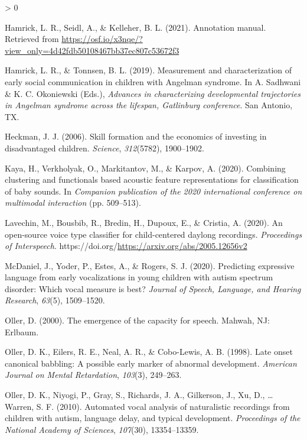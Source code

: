 \documentclass[
  english,
  ,man]{apa6}
\newlength{\cslhangindent}
\newenvironment{CSLReferences}[2] %
 {%
  \setlength{\parindent}{0pt}
  \ifodd #1 \everypar{\setlength{\hangindent}{\cslhangindent}}\ignorespaces\fi
  \ifnum #2 > 0
  \setlength{\parskip}{#2\baselineskip}
  \fi
 }%
 {}
\begin{document}
\begin{CSLReferences}{1}{0}
\leavevmode\hypertarget{ref-hamrick2021si}{}%
Hamrick, L. R., Seidl, A., \& Kelleher, B. L. (2021). Annotation manual. Retrieved from \url{https://osf.io/x3nqe/?view_only=4d42fdb50108467bb37ec807c53672f3}

\leavevmode\hypertarget{ref-hamrick2019measurement}{}%
Hamrick, L. R., \& Tonnsen, B. L. (2019). {Measurement and characterization of early social communication in children with Angelman syndrome}. In A. Sadhwani \& K. C. Okoniewski (Eds.), \emph{Advances in characterizing developmental trajectories in {A}ngelman syndrome across the lifespan, {G}atlinburg conference}. San Antonio, TX.

\leavevmode\hypertarget{ref-heckman2006skill}{}%
Heckman, J. J. (2006). Skill formation and the economics of investing in disadvantaged children. \emph{Science}, \emph{312}(5782), 1900--1902.

\leavevmode\hypertarget{ref-kaya2020combining}{}%
Kaya, H., Verkholyak, O., Markitantov, M., \& Karpov, A. (2020). Combining clustering and functionals based acoustic feature representations for classification of baby sounds. In \emph{Companion publication of the 2020 international conference on multimodal interaction} (pp. 509--513).

\leavevmode\hypertarget{ref-lavechin2020open}{}%
Lavechin, M., Bousbib, R., Bredin, H., Dupoux, E., \& Cristia, A. (2020). An open-source voice type classifier for child-centered daylong recordings. \emph{Proceedings of Interspeech}. https://doi.org/\url{https://arxiv.org/abs/2005.12656v2}

\leavevmode\hypertarget{ref-mcdaniel2020predicting}{}%
McDaniel, J., Yoder, P., Estes, A., \& Rogers, S. J. (2020). Predicting expressive language from early vocalizations in young children with autism spectrum disorder: Which vocal measure is best? \emph{Journal of Speech, Language, and Hearing Research}, \emph{63}(5), 1509--1520.

\leavevmode\hypertarget{ref-oller2000emergence}{}%
Oller, D. (2000). The emergence of the capacity for speech. Mahwah, NJ: Erlbaum.

\leavevmode\hypertarget{ref-oller1998late}{}%
Oller, D. K., Eilers, R. E., Neal, A. R., \& Cobo-Lewis, A. B. (1998). Late onset canonical babbling: A possible early marker of abnormal development. \emph{American Journal on Mental Retardation}, \emph{103}(3), 249--263.

\leavevmode\hypertarget{ref-oller2010automated}{}%
Oller, D. K., Niyogi, P., Gray, S., Richards, J. A., Gilkerson, J., Xu, D., \ldots{} Warren, S. F. (2010). Automated vocal analysis of naturalistic recordings from children with autism, language delay, and typical development. \emph{Proceedings of the National Academy of Sciences}, \emph{107}(30), 13354--13359.


\end{CSLReferences}
\end{document}
